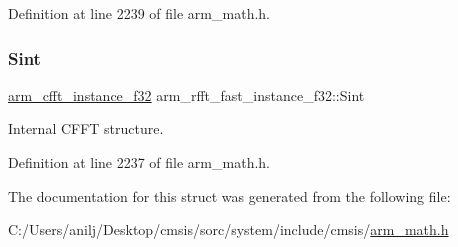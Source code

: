 Definition at line 2239 of file arm\+\_\+math.\+h.

\mbox{\label{structarm__rfft__fast__instance__f32_a37419ababdfb3151b1891ae6bcd21012}} 
\subsubsection{\texorpdfstring{Sint}{Sint}}
{\footnotesize\ttfamily \hyperlink{structarm__cfft__instance__f32}{arm\+\_\+cfft\+\_\+instance\+\_\+f32} arm\+\_\+rfft\+\_\+fast\+\_\+instance\+\_\+f32\+::\+Sint}

Internal C\+F\+FT structure. 

Definition at line 2237 of file arm\+\_\+math.\+h.



The documentation for this struct was generated from the following file\+:\begin{DoxyCompactItemize}
\item 
C\+:/\+Users/anilj/\+Desktop/cmsis/sorc/system/include/cmsis/\hyperlink{arm__math_8h}{arm\+\_\+math.\+h}\end{DoxyCompactItemize}
